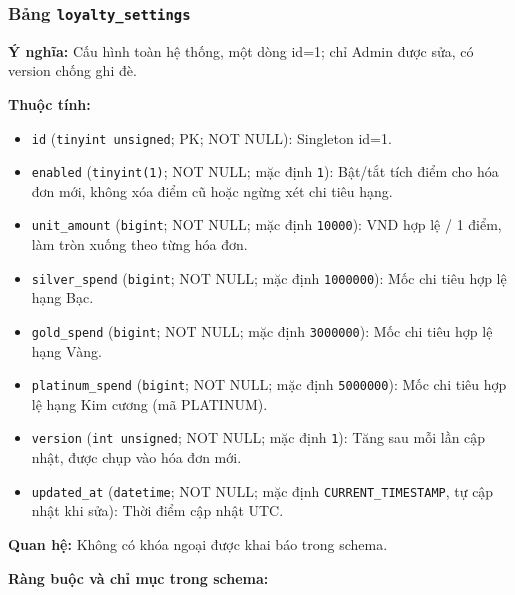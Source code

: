 \subsubsection{Bảng \texttt{loyalty\_settings}}

\textbf{Ý nghĩa:} Cấu hình toàn hệ thống, một dòng id=1; chỉ Admin được sửa, có version chống ghi đè.\par

\textbf{Thuộc tính:}

\begin{itemize}

\item \texttt{id} (\texttt{tinyint unsigned}; PK; NOT NULL): Singleton id=1.

\item \texttt{enabled} (\texttt{tinyint(1)}; NOT NULL; mặc định \texttt{1}): Bật/tắt tích điểm cho hóa đơn mới, không xóa điểm cũ hoặc ngừng xét chi tiêu hạng.

\item \texttt{unit\_amount} (\texttt{bigint}; NOT NULL; mặc định \texttt{10000}): VND hợp lệ / 1 điểm, làm tròn xuống theo từng hóa đơn.

\item \texttt{silver\_spend} (\texttt{bigint}; NOT NULL; mặc định \texttt{1000000}): Mốc chi tiêu hợp lệ hạng Bạc.

\item \texttt{gold\_spend} (\texttt{bigint}; NOT NULL; mặc định \texttt{3000000}): Mốc chi tiêu hợp lệ hạng Vàng.

\item \texttt{platinum\_spend} (\texttt{bigint}; NOT NULL; mặc định \texttt{5000000}): Mốc chi tiêu hợp lệ hạng Kim cương (mã PLATINUM).

\item \texttt{version} (\texttt{int unsigned}; NOT NULL; mặc định \texttt{1}): Tăng sau mỗi lần cập nhật, được chụp vào hóa đơn mới.

\item \texttt{updated\_at} (\texttt{datetime}; NOT NULL; mặc định \texttt{CURRENT\_TIMESTAMP}, tự cập nhật khi sửa): Thời điểm cập nhật UTC.

\end{itemize}

\textbf{Quan hệ:} Không có khóa ngoại được khai báo trong schema.

\textbf{Ràng buộc và chỉ mục trong schema:}

